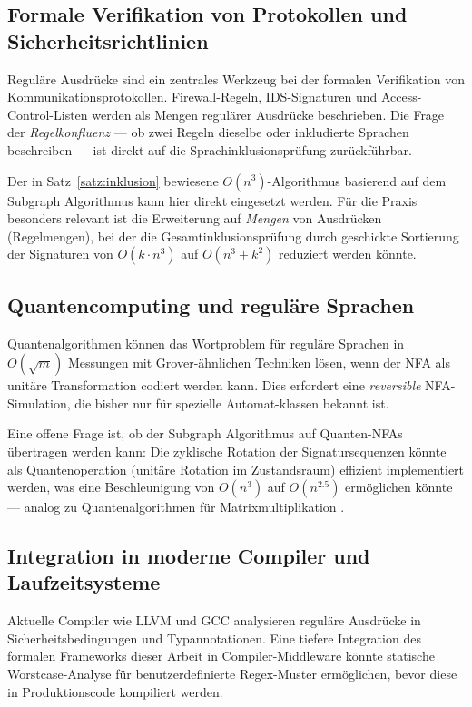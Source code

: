 ﻿\documentclass[a4paper,12pt]{article}
\theoremstyle{definition}
\begin{document}
\subsection{Formale Verifikation von Protokollen und Sicherheitsrichtlinien}

Reguläre Ausdrücke sind ein zentrales Werkzeug bei der formalen Verifikation
von Kommunikationsprotokollen. Firewall-Regeln, IDS-Signaturen und
Access-Control-Listen werden als Mengen regulärer Ausdrücke beschrieben. Die
Frage der \emph{Regelkonfluenz} --- ob zwei Regeln dieselbe oder inkludierte
Sprachen beschreiben --- ist direkt auf die Sprachinklusionsprüfung zurückführbar.

Der in Satz~\ref{satz:inklusion} bewiesene $O(n^3)$-Algorithmus basierend auf
dem Subgraph Algorithmus kann hier direkt eingesetzt werden. Für die Praxis
besonders relevant ist die Erweiterung auf \emph{Mengen} von Ausdrücken (Regelmengen),
bei der die Gesamtinklusionsprüfung durch geschickte Sortierung der Signaturen
von $O(k \cdot n^3)$ auf $O(n^3 + k^2)$ reduziert werden könnte.

\subsection{Quantencomputing und reguläre Sprachen}

Quantenalgorithmen können das Wortproblem für reguläre Sprachen in
$O(\sqrt{m})$ Messungen mit Grover-ähnlichen Techniken lösen, wenn der NFA
als unitäre Transformation codiert werden kann. Dies erfordert eine
\emph{reversible} NFA-Simulation, die bisher nur für spezielle Automat-klassen
bekannt ist.

Eine offene Frage ist, ob der Subgraph Algorithmus auf Quanten-NFAs übertragen
werden kann: Die zyklische Rotation der Signatursequenzen könnte als
Quantenoperation (unitäre Rotation im Zustandsraum) effizient implementiert
werden, was eine Beschleunigung von $O(n^3)$ auf $O(n^{2.5})$ ermöglichen könnte
--- analog zu Quantenalgorithmen für Matrixmultiplikation \cite{qsubgraph2026}.

\subsection{Integration in moderne Compiler und Laufzeitsysteme}

Aktuelle Compiler wie LLVM und GCC analysieren reguläre Ausdrücke in
Sicherheitsbedingungen und Typannotationen. Eine tiefere Integration des
formalen Frameworks dieser Arbeit in Compiler-Middleware könnte statische
Worstcase-Analyse für benutzerdefinierte Regex-Muster ermöglichen, bevor
diese in Produktionscode kompiliert werden.
\end{document}
